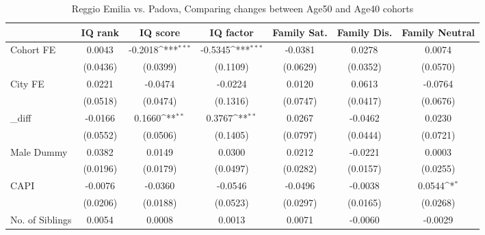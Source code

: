 \begin{table}[htbp]\centering
\def\sym#1{\ifmmode^{#1}\else\(^{#1}\)\fi}
\caption{Reggio Emilia vs. Padova, Comparing changes between Age50 and Age40 cohorts}
\begin{tabular}{l*{6}{c}}
\toprule
            &\multicolumn{1}{c}{IQ rank}&\multicolumn{1}{c}{IQ score}&\multicolumn{1}{c}{IQ factor}&\multicolumn{1}{c}{Family Sat.}&\multicolumn{1}{c}{Family Dis.}&\multicolumn{1}{c}{Family Neutral}\\
\midrule
Cohort FE   &      0.0043         &     -0.2018\sym{***}&     -0.5345\sym{***}&     -0.0381         &      0.0278         &      0.0074         \\
            &    (0.0436)         &    (0.0399)         &    (0.1109)         &    (0.0629)         &    (0.0352)         &    (0.0570)         \\
\addlinespace
City FE     &      0.0221         &     -0.0474         &     -0.0224         &      0.0120         &      0.0613         &     -0.0764         \\
            &    (0.0518)         &    (0.0474)         &    (0.1316)         &    (0.0747)         &    (0.0417)         &    (0.0676)         \\
\addlinespace
\_diff       &     -0.0166         &      0.1660\sym{**} &      0.3767\sym{**} &      0.0267         &     -0.0462         &      0.0230         \\
            &    (0.0552)         &    (0.0506)         &    (0.1405)         &    (0.0797)         &    (0.0444)         &    (0.0721)         \\
\addlinespace
Male Dummy  &      0.0382         &      0.0149         &      0.0300         &      0.0212         &     -0.0221         &      0.0003         \\
            &    (0.0196)         &    (0.0179)         &    (0.0497)         &    (0.0282)         &    (0.0157)         &    (0.0255)         \\
\addlinespace
CAPI        &     -0.0076         &     -0.0360         &     -0.0546         &     -0.0496         &     -0.0038         &      0.0544\sym{*}  \\
            &    (0.0206)         &    (0.0188)         &    (0.0523)         &    (0.0297)         &    (0.0165)         &    (0.0268)         \\
\addlinespace
No. of Siblings&      0.0054         &      0.0008         &      0.0013         &      0.0071         &     -0.0060         &     -0.0029         \\

\end{tabular}
\end{table}
